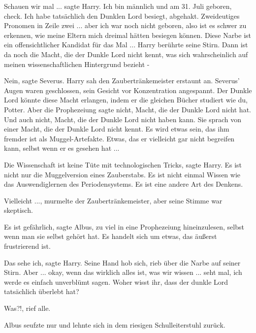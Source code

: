 \glqq{}Schauen wir mal ...\grqq{} sagte Harry. \glqq{}Ich bin männlich und am 31.
Juli geboren, check. Ich habe tatsächlich den Dunklen Lord besiegt, abgehakt.
Zweideutiges Pronomen in Zeile zwei ... aber ich war noch nicht geboren, also ist
es schwer zu erkennen, wie meine Eltern mich dreimal hätten besiegen können.
Diese Narbe ist ein offensichtlicher Kandidat für das Mal ...\grqq{} Harry
berührte seine Stirn. \glqq{}Dann ist da noch die Macht, die der Dunkle Lord
nicht kennt, was sich wahrscheinlich auf meinen wissenschaftlichen Hintergrund
bezieht -\grqq{}

\glqq{}Nein\grqq{}, sagte Severus. Harry sah den Zaubertränkemeister erstaunt an.
Severus' Augen waren geschlossen, sein Gesicht vor Konzentration angespannt.
\glqq{}Der Dunkle Lord könnte diese Macht erlangen, indem er die gleichen Bücher
studiert wie du, Potter. Aber die Prophezeiung sagte nicht, Macht, die der
Dunkle Lord nicht hat. Und auch nicht, Macht, die der Dunkle Lord nicht haben
kann. Sie sprach von einer Macht, die der Dunkle Lord nicht kennt. Es wird etwas
sein, das ihm fremder ist als Muggel-Artefakte. Etwas, das er vielleicht gar
nicht begreifen kann, selbst wenn er es gesehen hat ...\grqq{}

\glqq{}Die Wissenschaft ist keine Tüte mit technologischen Tricks\grqq{}, sagte
Harry. \glqq{}Es ist nicht nur die Muggelversion eines Zauberstabs. Es ist nicht
einmal Wissen wie das Auswendiglernen des Periodensystems. Es ist eine andere
Art des Denkens.\grqq{}

\glqq{}Vielleicht ...\grqq{}, murmelte der Zaubertränkemeister, aber seine Stimme
war skeptisch.

\glqq{}Es ist gefährlich\grqq{}, sagte Albus, \glqq{}zu viel in eine Prophezeiung
hineinzulesen, selbst wenn man sie selbst gehört hat. Es handelt sich um etwas,
das äußerst frustrierend ist.\grqq{}

\glqq{}Das sehe ich\grqq{}, sagte Harry. Seine Hand hob sich, rieb über die Narbe
auf seiner Stirn. \glqq{}Aber ... okay, wenn das wirklich alles ist, was wir
wissen ... seht mal, ich werde es einfach unverblümt sagen. Woher wisst ihr, dass
der dunkle Lord tatsächlich überlebt hat?\grqq{}

\glqq{}Was?!\grqq{}, rief alle.

Albus seufzte nur und lehnte sich in dem riesigen Schulleiterstuhl zurück.


